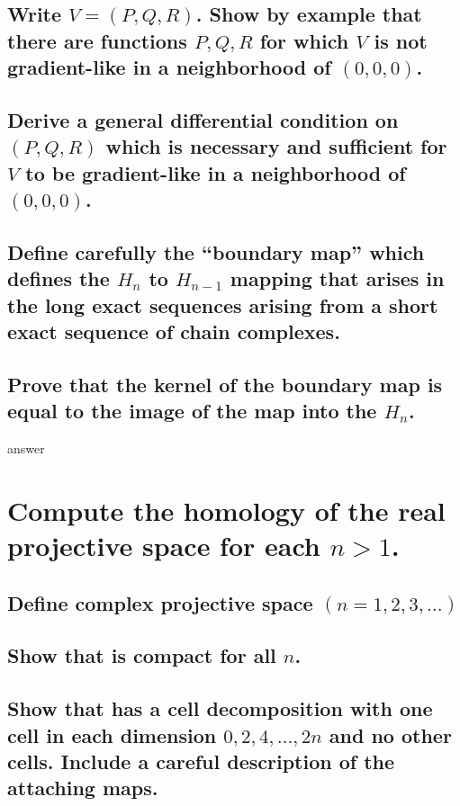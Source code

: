 \documentclass[10pt]{article}
\begin{document}
\subsection{Write $V = (P,Q,R)$. Show by example that there are functions $P,Q,R$ for which $V$ is
  not gradient-like in a neighborhood of $(0,0,0)$. }

\subsection{Derive a general differential condition on $(P,Q,R)$ which is necessary and sufficient
  for $V$ to be gradient-like in a neighborhood of $(0,0,0)$.}

\advsection{}

\subsection{Define carefully the ``boundary map'' which defines the $H_n$ to $H_{n-1}$ mapping that
  arises in the long exact sequences arising from a short exact sequence of chain complexes.}

\subsection{Prove that the kernel of the boundary map is equal to the image of the map into the $H_n$.}

answer

\section{Compute the homology of the real projective space  for each $n > 1$.}

\advsection{}

\subsection{Define complex projective space  $(n = 1,2,3, \dots)$}

\subsection{Show that  is compact for all $n$.}

\subsection{Show that  has a cell decomposition with one cell in each dimension
  $0,2,4,\dots, 2n$ and no other cells. Include a careful description of the attaching maps.}
\end{document}
